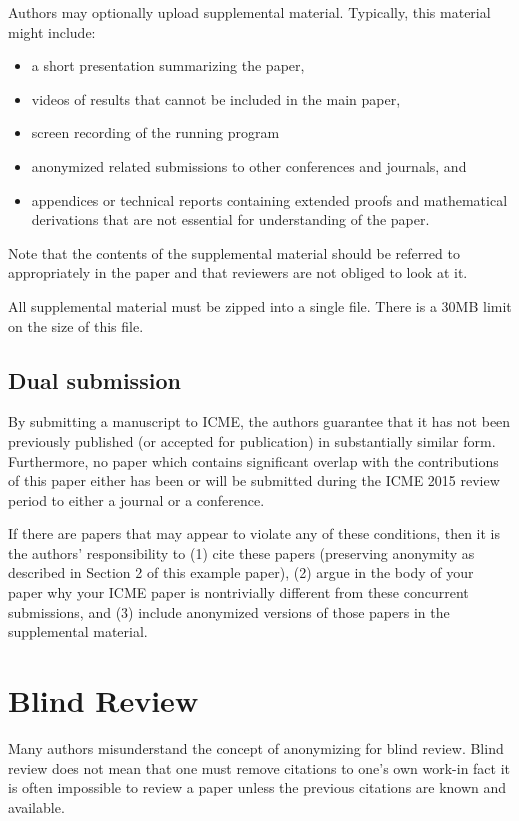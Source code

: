 \documentclass{article}
\begin{document}
Authors may optionally upload supplemental material. Typically, this material might include:
\begin{itemize}
  \item a short presentation summarizing the paper,
  \item videos of results that cannot be included in the main paper,
  \item screen recording of the running program
  \item anonymized related submissions to other conferences and journals, and
  \item appendices or technical reports containing extended proofs and mathematical derivations that are not essential for understanding of the paper.
\end{itemize}

Note that the contents of the supplemental material should be referred to appropriately in the paper and that reviewers are not obliged to look at it.

All supplemental material must be zipped into a single file. There is a 30MB limit on the size of this file.

\subsection{Dual submission}

By submitting a manuscript to ICME, the authors guarantee that it has not been previously published (or accepted for publication) in substantially similar form. Furthermore, no paper which contains significant overlap with the contributions of this paper either has been or will be submitted during the ICME 2015 review period to either a journal or a conference.

If there are papers that may appear to violate any of these conditions, then it is the authors' responsibility to (1) cite these papers (preserving anonymity as described in Section 2 of this example paper), (2) argue in the body of your paper why your ICME paper is nontrivially different from these concurrent submissions, and (3) include anonymized versions of those papers in the supplemental material.

\section{Blind Review}

Many authors misunderstand the concept of anonymizing for blind review. Blind review does not mean that one must remove citations to one's own work-in fact it is often impossible to review a paper unless the previous citations are known and available.
\end{document}
